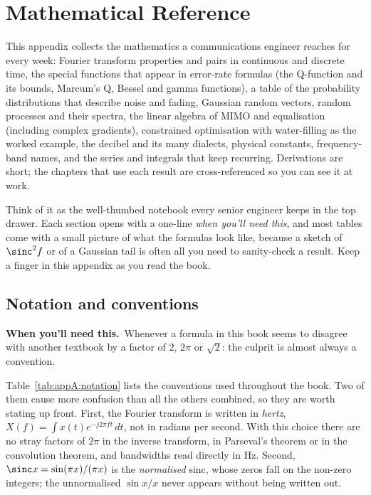 \chapter{Mathematical Reference}
\label{appA}

\providecommand{\whenneed}[1]{\par\noindent\begingroup\sffamily\small
  \textcolor{practc}{\bfseries When you'll need this.}\ #1\par\endgroup\medskip}

\begin{chapterintro}
This appendix collects the mathematics a communications engineer reaches for every week:
Fourier transform properties and pairs in continuous and discrete time, the special
functions that appear in error-rate formulas (the Q-function and its bounds, Marcum's Q,
Bessel and gamma functions), a table of the probability distributions that describe noise
and fading, Gaussian random vectors, random processes and their spectra, the linear algebra
of MIMO and equalisation (including complex gradients), constrained optimisation with
water-filling as the worked example, the decibel and its many dialects, physical constants,
frequency-band names, and the series and integrals that keep recurring. Derivations are
short; the chapters that use each result are cross-referenced so you can see it at work.

Think of it as the well-thumbed notebook every senior engineer keeps in the top drawer. Each
section opens with a one-line \emph{when you'll need this}, and most tables come with a small
picture of what the formulas look like, because a sketch of $\sinc^2 f$ or of a Gaussian tail
is often all you need to sanity-check a result. Keep a finger in this appendix as you read the book.
\end{chapterintro}

\section{Notation and conventions}
\label{sec:appA:notation}
\whenneed{Whenever a formula in this book seems to disagree with another textbook by a factor of
$2$, $2\pi$ or $\sqrt2$: the culprit is almost always a convention.}

Table~\ref{tab:appA:notation} lists the conventions used throughout the book. Two of them
cause more confusion than all the others combined, so they are worth stating up front.
First, the Fourier transform is written in \emph{hertz}, $X(f)=\int x(t)e^{-j2\pi ft}\,dt$,
not in radians per second. With this choice there are no stray factors of $2\pi$ in the
inverse transform, in Parseval's theorem or in the convolution theorem, and bandwidths read
directly in Hz. Second, $\sinc x=\sin(\pi x)/(\pi x)$ is the \emph{normalised} sinc, whose
zeros fall on the non-zero integers; the unnormalised $\sin x/x$ never appears without being
written out.


